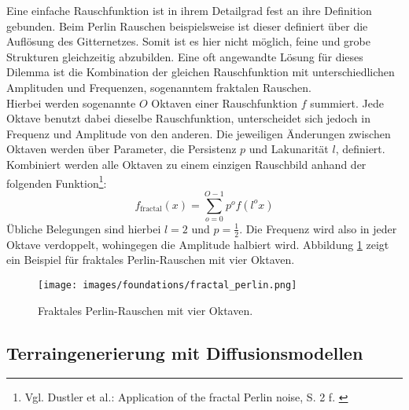 Eine einfache Rauschfunktion ist in ihrem Detailgrad fest an ihre Definition gebunden. Beim Perlin Rauschen beispielsweise ist dieser definiert über die Auflösung des Gitternetzes. Somit ist es hier nicht möglich, feine und grobe Strukturen gleichzeitig abzubilden. Eine oft angewandte Lösung für dieses Dilemma ist die Kombination der gleichen Rauschfunktion mit unterschiedlichen Amplituden und Frequenzen, sogenanntem fraktalen Rauschen. \\
Hierbei werden sogenannte $O$ Oktaven einer Rauschfunktion $f$ summiert. Jede Oktave benutzt dabei dieselbe Rauschfunktion, unterscheidet sich jedoch in Frequenz und Amplitude von den anderen. Die jeweiligen Änderungen zwischen Oktaven werden über Parameter, die Persistenz $p$ und Lakunarität $l$, definiert. Kombiniert werden alle Oktaven zu einem einzigen Rauschbild anhand der folgenden Funktion\footnote{
    Vgl. Dustler et al.: Application of the fractal Perlin noise, S. 2 f.
    \cite{dustler2015application}
}:  
\begin{equation}
    f_\text{fractal}(x) = \sum_{o=0}^{O-1} p^{o}f(l^ox)
\end{equation}
Übliche Belegungen sind hierbei $l=2$ und $p=\frac{1}{2}$. Die Frequenz wird also in jeder Oktave verdoppelt, wohingegen die Amplitude halbiert wird. Abbildung \ref{fig:fractal_perlin} zeigt ein Beispiel für fraktales Perlin-Rauschen mit vier Oktaven.

\begin{figure}[ht]
    \centering
    \texttt{[image: images/foundations/fractal\_perlin.png]} 
    \caption{Fraktales Perlin-Rauschen mit vier Oktaven.}
    \label{fig:fractal_perlin}
\end{figure}

\subsection{Terraingenerierung mit Diffusionsmodellen}

